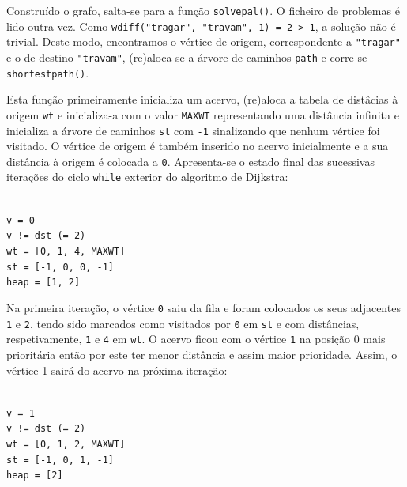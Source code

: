\documentclass[portuguese, a4paper]{article}
\newcommand\tu[0]{\textunderscore}
\begin{document}
	\par
	Construído o grafo, salta-se para a função \texttt{solve\tu pal()}.  O
	ficheiro de problemas é lido outra vez. Como \texttt{w\tu diff("tragar",
	"travam", 1) = 2 > 1}, a solução não é trivial. Deste modo, encontramos o
	vértice de origem, correspondente a \texttt{"tragar"} e o de destino
	\texttt{"travam"}, (re)aloca-se a árvore de caminhos \texttt{path} e
	corre-se \texttt{shortest\tu path()}.
	\par
	Esta função primeiramente inicializa um acervo, (re)aloca a tabela de
	distâcias à origem \texttt{wt} e inicializa-a com o valor \texttt{MAX\tu WT}
	representando uma distância infinita e inicializa a árvore de caminhos
	\texttt{st} com \texttt{-1} sinalizando que nenhum vértice foi visitado. O
	vértice de origem é também inserido no acervo inicialmente e a sua distância
	à origem é colocada a \texttt{0}. Apresenta-se o estado final das sucessivas
	iterações do ciclo \texttt{while} exterior do algoritmo de Dijkstra:
	\begin{center}
		\begin{minipage}{0.45\linewidth}
		\texttt{\\
		v = 0\\
		v != dst (= 2) \\
		wt = [0, 1, 4, MAX\tu WT] \\
		st = [-1, 0, 0, -1] \\
		heap = [1, 2] \\}
		\end{minipage}
	\end{center}
	\par
	Na primeira iteração, o vértice \texttt{0} saiu da fila e foram colocados os
	seus adjacentes \texttt{1} e \texttt{2}, tendo sido marcados como visitados
	por \texttt{0} em \texttt{st} e com distâncias, respetivamente, \texttt{1} e
	\texttt{4} em \texttt{wt}. O acervo ficou com o vértice \texttt{1} na
	posição 0 mais prioritária então por este ter menor distância e assim maior
	prioridade. Assim, o vértice 1 sairá do acervo na próxima iteração:
	\begin{center}
		\begin{minipage}{0.45\linewidth}
			\texttt{\\
			v = 1\\
			v != dst (= 2) \\
			wt = [0, 1, 2, MAX\tu WT] \\
			st = [-1, 0, 1, -1] \\
			heap = [2] \\}
		\end{minipage}
		\hspace{0.05\linewidth}
	\end{center}
\end{document}

